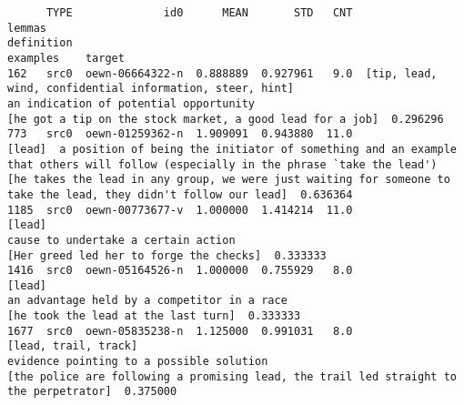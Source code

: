 \documentclass[a4paper,10pt,onecolumn,oneside,openright]{article}
\begin{document}
\begin{verbatim}
      TYPE              id0      MEAN       STD   CNT                                                    lemmas                                                                                                                        definition                                                                                                                                                                                     examples    target
162   src0  oewn-06664322-n  0.888889  0.927961   9.0  [tip, lead, wind, confidential information, steer, hint]                                                                                            an indication of potential opportunity                                                                                                                                    [he got a tip on the stock market, a good lead for a job]  0.296296
773   src0  oewn-01259362-n  1.909091  0.943880  11.0                                                    [lead]  a position of being the initiator of something and an example that others will follow (especially in the phrase `take the lead')                                                                             [he takes the lead in any group, we were just waiting for someone to take the lead, they didn't follow our lead]  0.636364
1185  src0  oewn-00773677-v  1.000000  1.414214  11.0                                                    [lead]                                                                                               cause to undertake a certain action                                                                                                                                                      [Her greed led her to forge the checks]  0.333333
1416  src0  oewn-05164526-n  1.000000  0.755929   8.0                                                    [lead]                                                                                       an advantage held by a competitor in a race                                                                                                                                                          [he took the lead at the last turn]  0.333333
1677  src0  oewn-05835238-n  1.125000  0.991031   8.0                                      [lead, trail, track]                                                                                          evidence pointing to a possible solution                                                                                                       [the police are following a promising lead, the trail led straight to the perpetrator]  0.375000

\end{verbatim}
\end{document}
